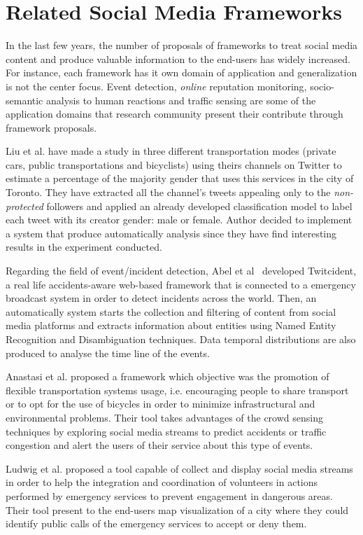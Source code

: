 \section{Related Social Media Frameworks}

In the last few years, the number of proposals of frameworks to treat social media content and produce valuable information to the end-users has widely increased. For instance, each framework has it own domain of application and generalization is not the center focus. Event detection, \textit{online} reputation monitoring, socio-semantic analysis to human reactions and traffic sensing are some of the application domains that research community present their contribute through framework proposals.

Liu et al. \cite{kn:Liu2012} have made a study in three different transportation modes (private cars, public transportations and bicyclists) using theirs channels on Twitter to estimate a percentage of the majority gender that uses this services in the city of Toronto. They have extracted all the channel's tweets appealing only to the \textit{non-protected} followers and applied an already developed classification model to label each tweet with its creator gender: male or female. Author decided to implement a system that produce automatically analysis since they have find interesting results in the experiment conducted.

Regarding the field of event/incident detection, Abel et al~\cite{kn:Abel2012} developed Twitcident, a real life accidents-aware web-based framework that is connected to a emergency broadcast system in order to detect incidents across the world. Then, an automatically system starts the collection and filtering of content from social media platforms and extracts information about entities using Named Entity Recognition and Disambiguation techniques. Data temporal distributions are also produced to analyse the time line of the events.

Anastasi et al. \cite{kn:Anastasi2013} proposed a framework which objective was the promotion of flexible transportation systems usage, i.e. encouraging people to share transport or to opt for the use of bicycles in order to minimize infrastructural and environmental problems. Their tool takes advantages of the crowd sensing techniques by exploring social media streams to predict accidents or traffic congestion and alert the users of their service about this type of events.

Ludwig et al. \cite{kn:Ludwig2015} proposed a tool capable of collect and display social media streams in order to help the integration and coordination of volunteers in actions performed by emergency services to prevent engagement in dangerous areas. Their tool present to the end-users map visualization of a city where they could identify public calls of the emergency services to accept or deny them.

